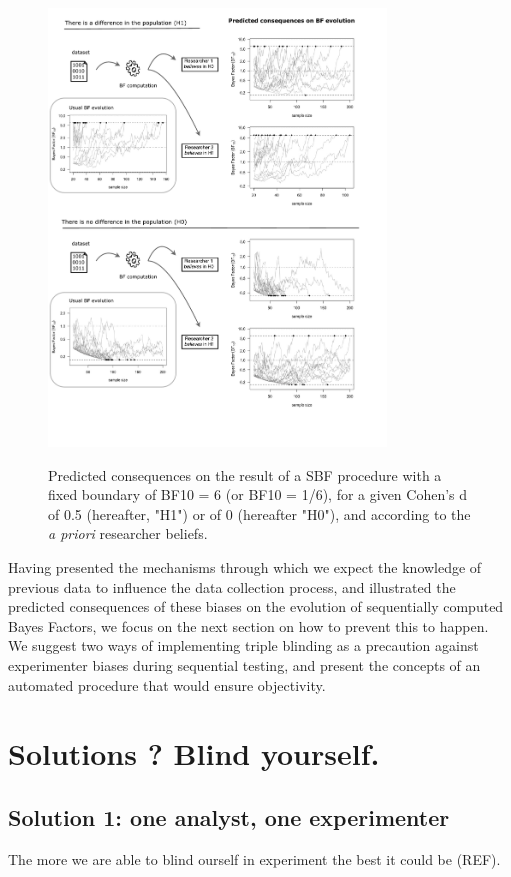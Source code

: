 \documentclass[a4paper,man,natbib,floatsintext,donotrepeattitle]{apa6}
\begin{document}
\begin{figure}[H]
  \caption{Predicted consequences on the result of a SBF procedure with a fixed boundary of BF10 = 6 (or BF10 = 1/6), for a given Cohen's d of 0.5 (hereafter, "H1") or of 0 (hereafter "H0"), and according to the \emph{a priori} researcher beliefs.}
  \centering
  \includegraphics[width=0.8\textwidth]{figures/BFF_predictions.pdf}
  \label{fig:pred}
\end{figure}

Having presented the mechanisms through which we expect the knowledge of previous data to influence the data collection process, and illustrated the predicted consequences of these biases on the evolution of sequentially computed Bayes Factors, we focus on the next section on how to prevent this to happen. We suggest two ways of implementing triple blinding as a precaution against experimenter biases during sequential testing, and present the concepts of an automated procedure that would ensure objectivity.

\section{Solutions ? Blind yourself.}

\subsection{Solution 1: one analyst, one experimenter}
The more we are able to blind ourself in experiment the best it could be (REF). 
\end{document}
